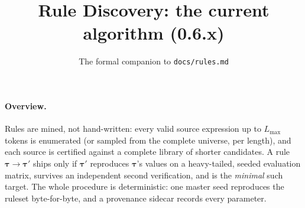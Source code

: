 \documentclass[10pt]{article}
\title{\Simplipy{} Rule Discovery: the current algorithm (0.6.x)}
\author{The formal companion to \texttt{docs/rules.md}}
\date{}
\newcommand{\ttau}{\bm{\tau}}
\begin{document}
\maketitle

\paragraph{Overview.} Rules are mined, not hand-written: every valid source expression up
to $L_{\max}$ tokens is enumerated (or sampled from the complete universe, per length),
and each source is certified against a complete library of shorter candidates. A rule
$\ttau \to \ttau'$ ships only if $\ttau'$ reproduces $\ttau$'s values on a heavy-tailed,
seeded evaluation matrix, survives an independent second verification, and is the
\emph{minimal} such target. The whole procedure is deterministic: one master seed
reproduces the ruleset byte-for-byte, and a provenance sidecar records every parameter.
\end{document}
